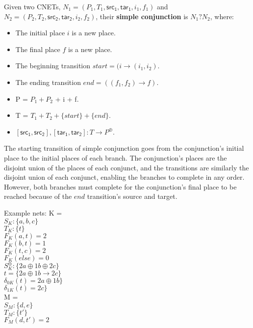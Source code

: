 \begin{definition}
  \label{def:SIMP-AND-PN}
  Given two CNETs, $N_1= (P_1, T_1, \mathsf{src_1}, \mathsf{tar_1}, i_1, f_1)$ and $N_2= (P_2, T_2, \mathsf{src_2}, \mathsf{tar_2}, i_2, f_2)$, their \textbf{simple conjunction} is $N_1 ? N_2$, where: 
\begin{itemize}
\item The initial place $i$ is a new place.
\item The final place $f$ is a new place.
\item The beginning transition $start = (i \to (i_1, i_2)$.  
\item The ending transition $end = ((f_1, f_2) \to f)$. 
\item P = $P_1 + P_2$ + i + f.
\item T = $T_1 + T_2 + \{start\} +\{end\}$.
\item $[\mathsf{src_1}, \mathsf{src_2}], [\mathsf{tar_1}, \mathsf{tar_2}]: T\to P^\oplus$. 
\end{itemize}
The starting transition of simple conjunction goes from the conjunction's initial place to the initial places of each branch. The conjunction's places are the disjoint union of the places of each conjunct, and the transitions are similarly the disjoint union of each conjunct, enabling the branches to complete in any order. However, both branches must complete for the conjunction's final place to be reached because of the $end$ transition's source and target.      
\end{definition}
\newpage
Example nets:
%
K = \\
$S_K :\{ a, b, c\}$\\
$T_K :\{t\}$\\  
$F_K (a, t) = 2$\\
$F_K (b, t) = 1$\\
$F_K (t, c) = 2$\\
$F_K (else) = 0$\\
%
$S_K^\oplus :\{ 2a \oplus 1b \oplus 2c\}$\\
$t = \{ 2a \oplus 1b \to 2c \}$\\  
$\delta_{0K} (t) = 2a \oplus 1b \}$\\
$\delta_{1K} (t) = 2c \}$\\
\smallskip
M = \\
$S_M :\{d,e\}$\\
$T_M :\{t'\}$\\  
$F_M (d, t') = 2$\\
